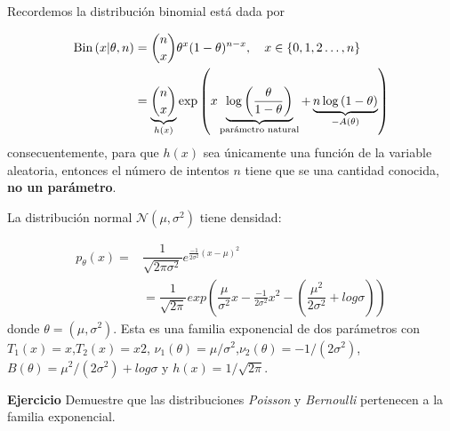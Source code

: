 \begin{example}
Recordemos la distribución binomial está dada por 

\begin{align*}
	\text{Bin}\left(x|\theta,n\right) 	&=\binom{n}{x}\theta^x(1-\theta)^{n-x},\quad x\in\{0,1,2\ldots,n\}\\
					&=
					\underbrace{\binom{n}{x}}_{h(x)}\exp\left(x\underbrace{\log\left(\frac{\theta}{1-\theta}\right)}_{\text{parámetro natural}} + \underbrace{n\log\left(1-\theta\right)}_{-{A(\theta)}}\right)\\
\end{align*}
consecuentemente, para que $h(x)$ sea únicamente una función de la variable aleatoria, entonces el número de intentos $n$ tiene que se una cantidad conocida, \textbf{no un parámetro}. 	
 \end{example} 

\begin{example} 
La distribución normal $\mathcal{N}(\mu,\sigma^{2})$ tiene densidad:

\begin{align}
    p_{\theta}(x) = &  \dfrac{1}{\sqrt{2\pi \sigma^{2}}} e^{\frac{-1}{2\sigma^{2}}(x-\mu)^{2}}\\
    & = \dfrac{1}{\sqrt{2\pi}}exp(\dfrac{\mu}{\sigma^{2}}x -\frac{-1}{2\sigma^{2}}x^{2} - (\dfrac{\mu^{2}}{2\sigma^{2}} + log \sigma ))
\end{align}
donde $\theta = (\mu, \sigma^{2})$. Esta es una familia exponencial de dos parámetros con $T_{1}(x) = x$,$T_{2} (x) = x2$, $\nu_{1}(\theta) = \mu/\sigma^{2}$,$\nu_{2}(\theta) = -1/(2\sigma^{2})$, $B(\theta) = \mu^{2}/(2\sigma^{2}) + log \sigma $ y $h(x) = 1/\sqrt{2\pi}$.

\end{example}

\begin{example} \textbf{Ejercicio} Demuestre que las distribuciones \emph{Poisson} y \emph{Bernoulli} pertenecen a la familia exponencial. 

\end{example}


